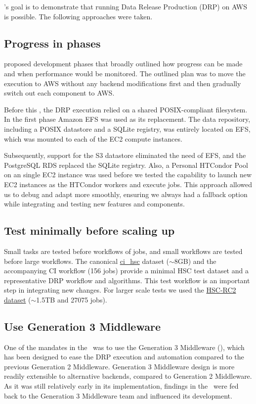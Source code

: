 \poc's goal is to demonstrate that running Data Release Production (DRP) on AWS is possible.
The following approaches were taken.

\subsection{Progress in phases}

 proposed development phases that broadly outlined how progress can be made and when performance would be monitored.
The outlined plan was to move the execution to AWS without any backend modifications first and then gradually switch out each component to AWS.

Before this \poc, the DRP execution relied on a shared POSIX-compliant filesystem.
In the first phase Amazon EFS was used as its replacement.
The data repository, including a POSIX datastore and a SQLite registry, was entirely located on EFS, which was mounted to each of the EC2 compute instances.

Subsequently, support for the S3 datastore eliminated the need of EFS, and the PostgreSQL RDS replaced the SQLite registry.
Also, a Personal HTCondor Pool on an single EC2 instance was used before we tested the capability to launch new EC2 instances as the HTCondor workers and execute jobs.
This approach allowed us to debug and adapt more smoothly, ensuring we always had a fallback option while integrating and testing new features and components.

\subsection{Test minimally before scaling up}

Small tasks are tested before workflows of jobs, and small workflows are tested before large workflows.
The canonical \href{https://github.com/lsst/ci\_hsc}{ci\_hsc} dataset ($\sim$8GB) and the accompanying CI workflow (156 jobs) provide a minimal HSC test dataset and a representative DRP workflow and algorithms.
This test workflow is an important step in integrating new changes.
For larger scale tests we used the \href{https://jira.lsstcorp.org/browse/DM-11345}{HSC-RC2 dataset} ($\sim$1.5TB and 27075 jobs).

\subsection{Use Generation 3 Middleware}

One of the mandates in the \poc~was to use the Generation 3 Middleware (), which has been designed to ease the DRP execution and automation compared to the previous Generation 2 Middleware.
Generation 3 Middleware design is more readily extensible to alternative backends, compared to Generation 2 Middleware.
As it was still relatively early in its implementation, findings in the \poc~were fed back to the Generation 3 Middleware team and influenced its development.

